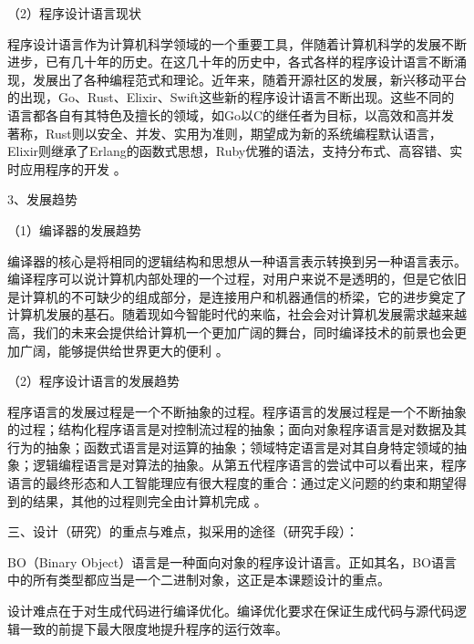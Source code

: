 \documentclass{csustThesis}
\begin{document}
\begin{ubox}[breakable,]
（2）程序设计语言现状

程序设计语言作为计算机科学领域的一个重要工具，伴随着计算机科学的发展不断进步，已有几十年的历史。在这几十年的历史中，各式各样的程序设计语言不断涌现，发展出了各种编程范式和理论。近年来，随着开源社区的发展，新兴移动平台的出现，Go、Rust、Elixir、Swift这些新的程序设计语言不断出现。这些不同的语言都各自有其特色及擅长的领域，如Go以C的继任者为目标，以高效和高并发著称，Rust则以安全、并发、实用为准则，期望成为新的系统编程默认语言，Elixir则继承了Erlang的函数式思想，Ruby优雅的语法，支持分布式、高容错、实时应用程序的开发\cite*{cym2017} 。

3、发展趋势

（1）编译器的发展趋势

编译器的核心是将相同的逻辑结构和思想从一种语言表示转换到另一种语言表示。编译程序可以说计算机内部处理的一个过程，对用户来说不是透明的，但是它依旧是计算机的不可缺少的组成部分，是连接用户和机器通信的桥梁，它的进步奠定了计算机发展的基石。随着现如今智能时代的来临，社会会对计算机发展需求越来越高，我们的未来会提供给计算机一个更加广阔的舞台，同时编译技术的前景也会更加广阔，能够提供给世界更大的便利\cite*{hp2018} 。

（2）程序设计语言的发展趋势

程序语言的发展过程是一个不断抽象的过程。程序语言的发展过程是一个不断抽象的过程；结构化程序语言是对控制流过程的抽象；面向对象程序语言是对数据及其行为的抽象；函数式语言是对运算的抽象；领域特定语言是对其自身特定领域的抽象；逻辑编程语言是对算法的抽象。从第五代程序语言的尝试中可以看出来，程序语言的最终形态和人工智能理应有很大程度的重合：通过定义问题的约束和期望得到的结果，其他的过程则完全由计算机完成\cite*{cym2017} 。

\end{ubox}

\vspace{-\baselineskip}

\begin{ubox}[breakable,]
\noindent 三、设计（研究）的重点与难点，拟采用的途径（研究手段）：

BO（Binary Object）语言是一种面向对象的程序设计语言。正如其名，BO语言中的所有类型都应当是一个二进制对象，这正是本课题设计的重点。

设计难点在于对生成代码进行编译优化。编译优化要求在保证生成代码与源代码逻辑一致的前提下最大限度地提升程序的运行效率。

\end{ubox}

\vspace{-\baselineskip}
\end{document}
